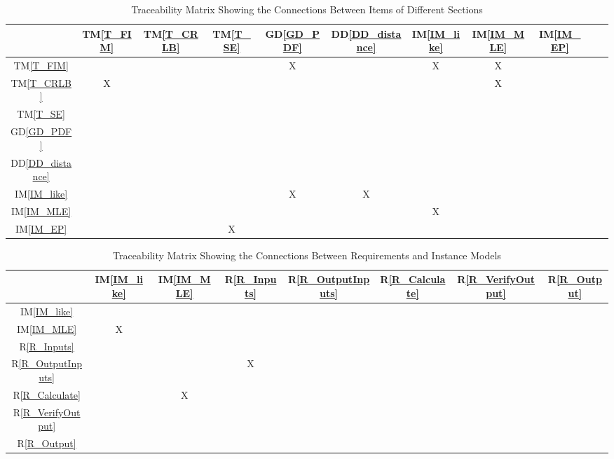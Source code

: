 \documentclass[12pt]{article}
\newcommand{\dref}[1]{GD\ref{#1}}
\newcommand{\ddref}[1]{DD\ref{#1}}
\newcommand{\tref}[1]{TM\ref{#1}}
\newcommand{\iref}[1]{IM\ref{#1}}
\newcommand{\rref}[1]{R\ref{#1}}
\begin{document}
\begin{table}[h!]
\centering
\begin{tabular}{|c|c|c|c|c|c|c|c|c|c|c|}
\hline        
	& \tref{T_FIM}& \tref{T_CRLB}& \tref{T_SE} & \dref{GD_PDF}& \ddref{DD_distance} & \iref{IM_like} & \iref{IM_MLE} & \iref{IM_EP}\\
\hline
\tref{T_FIM}          & & & & X& &X &X & \\ \hline
\tref{T_CRLB}         & X& & & & & & X & \\ \hline
\tref{T_SE}           & & & & & & &  &\\ \hline
\dref{GD_PDF}         & & & & & & &  &\\ \hline
\ddref{DD_distance}   & & & & & & &  &\\ \hline
\iref{IM_like}        & & & &X &X & &  &\\ \hline
\iref{IM_MLE}         & & & & & &X & &\\ \hline
\iref{IM_EP}         & & &X & & & & &\\
\hline
\end{tabular}
\caption{Traceability Matrix Showing the Connections Between Items of Different Sections}
\label{Table:trace}
\end{table}

\begin{table}[h!]
\centering
\begin{tabular}{|c|c|c|c|c|c|c|c|}
\hline
	& \iref{IM_like}& \iref{IM_MLE}& \rref{R_Inputs}& \rref{R_OutputInputs}& \rref{R_Calculate}& \rref{R_VerifyOutput}& \rref{R_Output} \\
\hline
\iref{IM_like}          & & & & & & & \\ \hline
\iref{IM_MLE}           & X& & & & & & \\ \hline
\rref{R_Inputs}         & & & & & & & \\ \hline
\rref{R_OutputInputs}   & & & X& & & & \\ \hline
\rref{R_Calculate}      & & X& & & & & \\ \hline
\rref{R_VerifyOutput}   & & & & & & & \\ \hline
\rref{R_Output}         & & & & & & & \\
\hline
\end{tabular}
\caption{Traceability Matrix Showing the Connections Between Requirements and Instance Models}
\label{Table:R_trace}
\end{table}
\end{document}
